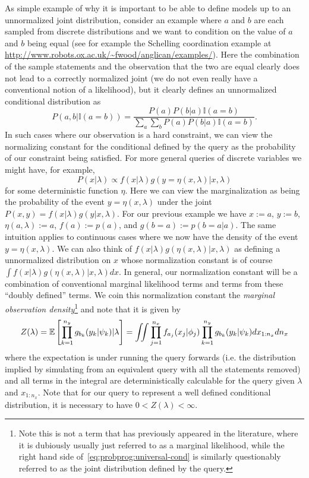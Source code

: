 As simple example of why it is important to be able to define models up to an unnormalized joint
distribution, consider an example where $a$ and $b$ are each sampled from discrete distributions
and we want to condition on the value of $a$ and $b$ being equal (see for example the Schelling
coordination example at {\small \url{http://www.robots.ox.ac.uk/~fwood/anglican/examples/}}).  Here
the combination of the sample statements and the observation that the two are equal clearly
does not lead to a correctly normalized joint (we do not even really have a conventional notion
of a likelihood), but it clearly defines an unnormalized conditional distribution as
\[
P(a,b | \mathbb{I}(a=b)) = \frac{P(a)P(b|a)\mathbb{I}(a=b)}{\sum_a \sum_b P(a)P(b|a) \mathbb{I}(a=b)}.
\]
In such cases where our observation is a hard constraint, we can view the normalizing constant for
the conditional defined by the query as the probability of our constraint being satisfied.  
For more general queries of discrete variables we might have, for example,
\[
P(x|\lambda) \propto f(x|\lambda)g(y=\eta(x,\lambda)|x,\lambda)
\]
for some deterministic function $\eta$.  Here we
can view the marginalization as being the probability of the event $y=\eta(x,\lambda)$ under the joint $P(x,y)=f(x|\lambda)g(y|x,\lambda)$.
For our previous example we have $x:=a$, $y:=b$, $\eta(a,\lambda):=a$, $f(a):=p(a)$, and $g(b=a):=p(b=a|a)$.
The same intuition applies to continuous cases where we now have the density of the event $y=\eta(x,\lambda)$.
We can also think of $f(x|\lambda)g(\eta(x,\lambda)|x,\lambda)$ as defining a unnormalized distribution on $x$ whose
normalization constant is of course $\int f(x|\lambda)g(\eta(x,\lambda)|x,\lambda) dx$.  In general, our normalization
constant will be a combination of conventional marginal likelihood terms and terms from these ``doubly defined''
terms. We coin this normalization constant the \emph{marginal observation density}\footnote{Note this is not a
	term that has previously appeared in the literature, where it is dubiously usually just referred to as a marginal
	likelihood, while the right hand side of~\eqref{eq:probprog:universal-cond} is similarly questionably
	referred to as the joint distribution defined by the query.} and note that it is given by
\begin{align}
\label{eq:probprog:mod}
Z(\lambda) = \mathbb{E} \left[ \prod_{k=1}^{n_y} g_{b_k}(y_k | \psi_k) | \lambda \right]
= \iint \prod_{j=1}^{n_x} f_{a_j}(x_j | \phi_j) \prod_{k=1}^{n_y} g_{b_k}(y_k | \psi_k) dx_{1:n_x} dn_x
\end{align}
where the expectation is under running the query forwards (i.e. the distribution implied by simulating
from an equivalent query with all the \observe statements removed) and 
all terms in the integral are deterministically calculable for the query given $\lambda$ and $x_{1:n_x}$.
Note that for our query to represent a well defined conditional distribution, it is necessary to have
$0<Z(\lambda)<\infty$.

